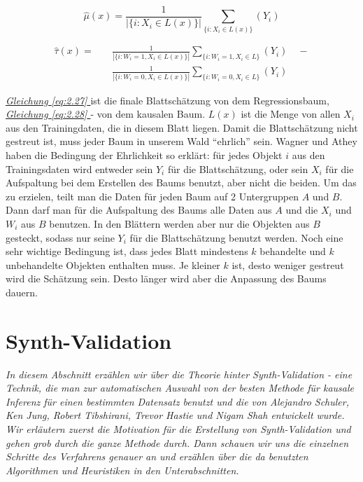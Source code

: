 \documentclass[12pt,a4paper,twoside]{scrartcl}
\numberwithin{equation}{section}
\renewcommand*{\refeq}[1]{\emph{\hyperref[#1]{Gleichung \ref*{#1} }}}
\begin{document}
\begin{equation}\label{eq:2.27}
	\hat \mu(x) = \frac{1}{|\{i : X_i \in L(x)\}|}\sum_{\{i : X_i \in L(x)\}}(Y_i)
\end{equation} 

\begin{equation}\label{eq:2.28}
\begin{split}
	\hat \tau(x) = \quad&\frac{1}{|\{i : W_i = 1,X_i \in L(x)\}|}\sum_{\{i : W_i = 1,X_i \in L\}}(Y_i)\quad - \\ 
	&\frac{1}{|\{i : W_i = 0,X_i \in L(x)\}|}\sum_{\{i : W_i = 0,X_i \in L\}}(Y_i)
\end{split}
\end{equation} 

\noindent
\refeq{eq:2.27} ist die finale Blattschätzung von dem Regressionsbaum, \refeq{eq:2.28} - von dem kausalen Baum. $L(x)$ ist die Menge von allen $X_i$ aus den Trainingdaten, die in diesem Blatt liegen. Damit die Blattschätzung nicht gestreut ist, muss jeder Baum in unserem Wald \enquote{ehrlich} sein. Wagner und Athey\cite{wager2018estimation} haben die Bedingung der Ehrlichkeit so erklärt: für jedes Objekt $i$ aus den Trainingsdaten wird entweder sein $Y_i$ für die Blattschätzung, oder sein $X_i$ für die Aufspaltung bei dem Erstellen des Baums benutzt, aber nicht die beiden. Um das zu erzielen, teilt man die Daten für jeden Baum auf 2 Untergruppen $A$ und $B$. Dann darf man für die Aufspaltung des Baums alle Daten aus $A$ und die $X_i$ und $W_i$ aus $B$ benutzen. In den Blättern werden aber nur die Objekten aus $B$ gesteckt, sodass nur seine $Y_i$ für die Blattschätzung benutzt werden. Noch eine sehr wichtige Bedingung ist, dass jedes Blatt mindestens $k$ behandelte und $k$ unbehandelte Objekten enthalten muss. Je kleiner $k$ ist, desto weniger gestreut wird die Schätzung sein. Desto länger wird aber die Anpassung des Baums dauern\cite{wager2018estimation}.   

\clearpage

\section{Synth-Validation}\label{sec:synthValidation}

\noindent
\emph{In diesem Abschnitt erzählen wir über die Theorie hinter Synth-Validation - eine Technik, die man zur automatischen Auswahl von der besten Methode für kausale Inferenz für einen bestimmten Datensatz benutzt und die von Alejandro Schuler, Ken Jung, Robert Tibshirani, Trevor Hastie und Nigam Shah entwickelt wurde\cite{schuler2017synth}. Wir erläutern zuerst die Motivation für die Erstellung von Synth-Validation und gehen grob durch die ganze Methode durch. Dann schauen wir uns die einzelnen Schritte des Verfahrens genauer an und erzählen über die da benutzten Algorithmen und Heuristiken in den Unterabschnitten.}\par
\end{document}
